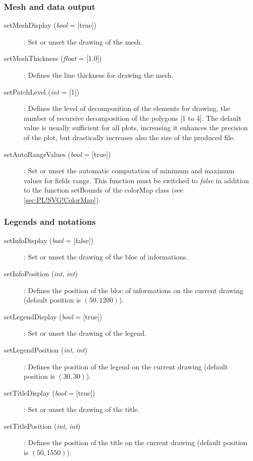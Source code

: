 \subsubsection{Mesh and data output}
\begin{description}
\item [{setMeshDisplay (\emph{bool} = [true])}] : Set or unset the drawing of the mesh.
\item [{setMeshThickness (\emph{float} = [1.0])}] : Defines the line thickness for drawing the mesh.
\item [{setPatchLevel (\emph{int} = [1])}] : Defines the level of decomposition of the elements for drawing, \ie the number of recursive decomposition of the polygons [1 to 4]. The default value is usually sufficient for all plots, increasing it enhances the precision of the plot, but drastically increases also the size of the produced file.
\item [{setAutoRangeValues (\emph{bool} = [true])}] : Set or unset the automatic computation of minimum and maximum values for fields range. This function must be switched to \emph{false} in addition to the function \textsf{setBounds} of the \textsf{colorMap} class (see \ref{sec:PL!SVG!ColorMap}).
\end{description}

\subsubsection{Legends and notations}
\begin{description}
\item [{setInfoDisplay (\emph{bool} = [false])}] : Set or unset the drawing of the bloc of informations.
\item [{setInfoPosition (\emph{int}, \emph{int})}] : Defines the position of the bloc of informations on the current drawing (default position is $(50, 1200)$).
\item [{setLegendDisplay (\emph{bool} = [true])}] :  Set or unset the drawing of the legend.
\item [{setLegendPosition (\emph{int}, \emph{int})}] : Defines the position of the legend on the current drawing (default position is $(30, 30)$).
\item [{setTitleDisplay (\emph{bool} = [true])}] :  Set or unset the drawing of the title.
\item [{setTitlePosition (\emph{int}, \emph{int})}] : Defines the position of the title on the current drawing (default position is $(50, 1550)$).
\end{description}

